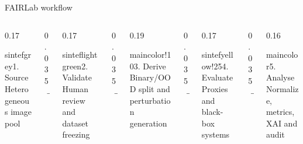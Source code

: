 \documentclass{beamer}
\begin{document}
\begin{frame}{FAIRLab workflow}
\small

\begin{columns}[c,onlytextwidth]

\begin{column}{0.17\textwidth}
\begin{colorblock}[black]{sintefgrey}{1. Source}
\centering
\scriptsize Heterogeneous image pool
\end{colorblock}
\end{column}

\begin{column}{0.035\textwidth}
\centering
{\Large\color{maincolor}$\rightarrow$}
\end{column}

\begin{column}{0.17\textwidth}
\begin{colorblock}[black]{sinteflightgreen}{2. Validate}
\centering
\scriptsize Human review and dataset freezing
\end{colorblock}
\end{column}

\begin{column}{0.035\textwidth}
\centering
{\Large\color{maincolor}$\rightarrow$}
\end{column}

\begin{column}{0.19\textwidth}
\begin{colorblock}[black]{maincolor!10}{3. Derive}
\centering
\scriptsize Binary/OOD split and perturbation generation
\end{colorblock}
\end{column}

\begin{column}{0.035\textwidth}
\centering
{\Large\color{maincolor}$\rightarrow$}
\end{column}

\begin{column}{0.17\textwidth}
\begin{colorblock}[black]{sintefyellow!25}{4. Evaluate}
\centering
\scriptsize Proxies and black-box systems
\end{colorblock}
\end{column}

\begin{column}{0.035\textwidth}
\centering
{\Large\color{maincolor}$\rightarrow$}
\end{column}

\begin{column}{0.16\textwidth}
\begin{colorblock}[white]{maincolor}{5. Analyse}
\centering
\scriptsize Normalize, metrics, XAI and audit
\end{colorblock}
\end{column}


\end{columns}
\end{frame}
\end{document}
